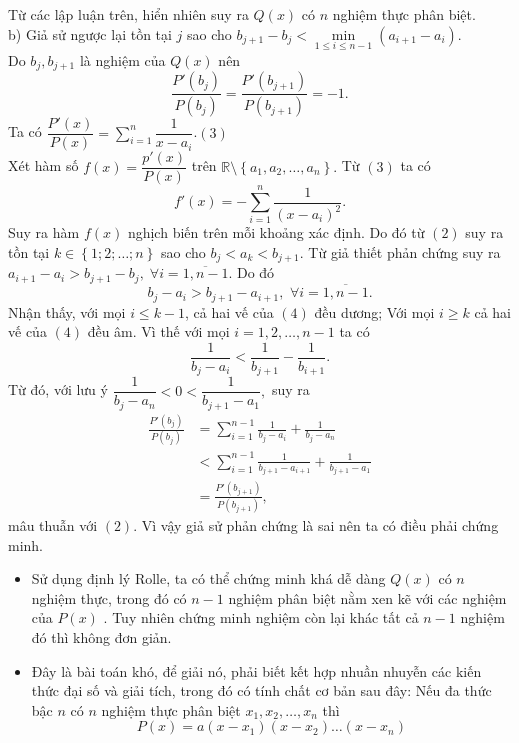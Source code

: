 \begin{bt}
{\begin{itemize}
		\end{itemize}
		Từ các lập luận trên, hiển nhiên suy ra $Q(x)$ có $n$ nghiệm thực phân biệt.\\
		b) Giả sử ngược lại tồn tại $j$ sao cho $b_{j+1}-b_{j}<\underset{1\leq i\leq n-1}{\min}\left ( a_{i+1} -a_{i}\right ). $\\
		Do $b_{j},b_{j+1}$ là nghiệm của $Q(x)$ nên 
		\[\frac{P'\left ( b_j \right )}{P\left ( b_j \right )}=\frac{P'\left ( b_{j+1} \right )}{P\left ( b_{j+1} \right )}=-1.\tag{2}\]
		Ta có $\dfrac{P'\left ( x \right )}{P\left ( x \right )}=\sum_{i=1}^{n}\dfrac{1}{x-a_{i}}$.\hfill$(3)$\\
		Xét hàm số $f\left ( x \right )=\dfrac{p'\left ( x \right )}{P\left ( x \right )} $ trên $\mathbb{R}\setminus \left \{ a_1,a_2,\dots,a_n \right \}. $ Từ $(3)$ ta có $$f'\left ( x \right )=-\sum_{i=1}^{n}\frac{1}{\left ( x-a_{i} \right )^{2}}. $$
		Suy ra hàm $f(x)$ nghịch biến trên mỗi khoảng xác định. 
		Do đó từ $(2)$ suy ra tồn tại $ k\in\left \{ 1;2;\dots;n \right \}$ sao cho $ b_j<a_k<b_{j+1}.$
		Từ giả thiết phản chứng suy ra  $a_{i+1}-a_i>b_{j+1}-b_{j}, \;\forall i=\overline{1,n-1}. $ Do đó 
		\[b_j-a_i>b_{j+1}-a_{i+1},\,\, \forall i=\overline{1,n-1}.\tag{4}\]
		Nhận thấy, với mọi $ i\leq k-1$, cả hai vế của $(4)$ đều dương; Với mọi $i\geq k $ cả hai vế của $(4)$ đều âm. Vì thế với mọi $i=1,2,\dots,n-1$ ta có 
		$$ \frac{1}{b_{j}-a_i}< \frac{1}{b_{j+1}}-\frac{1}{b_{i+1}}. $$
		Từ đó, với lưu ý  $\dfrac{1}{b_j-a_n}<0<\dfrac{1}{b_{j+1}-a_1}, $ suy ra 
		{\allowdisplaybreaks
		\begin{align*}
		\frac{P'\left ( b_j \right )}{P\left ( b_j \right )}&=\sum_{i=1}^{n-1}\frac{1}{b_j-a_i}+\frac{1}{b_j-a_n}\\
		&<\sum_{i=1}^{n-1}\frac{1}{b_{j+1}-a_{i+1}}+\frac{1}{b_{j+1}-a_1}\\
		&=\frac{P'\left ( b_{j+1} \right )}{P\left ( b_{j+1} \right )},
		\end{align*}}mâu thuẫn với $(2).$ Vì vậy giả sử phản chứng là sai nên ta có điều phải chứng minh.		
		\begin{nx}\hfill
		\begin{itemize}
			\item Sử dụng định lý Rolle, ta có thể chứng minh khá dễ dàng $Q(x)$ có $n$ nghiệm thực, trong đó có $n-1$ nghiệm phân biệt nằm xen kẽ với các nghiệm của $P(x)$ . Tuy nhiên chứng minh nghiệm còn lại khác tất cả $n-1$ nghiệm đó thì không đơn giản.
			\item  Đây là bài toán khó, để giải nó, phải biết kết hợp nhuần nhuyễn các kiến thức đại số và giải tích, trong đó có tính chất cơ bản sau đây: Nếu đa thức bậc $n$ có $n$ nghiệm thực phân biệt $x_1,x_2,\dots,x_n$ thì $$P\left ( x \right )=a\left ( x-x_{1} \right )\left ( x-x_{2} \right )\dots\left ( x-x_{n} \right ) $$

\end{itemize}
\end{nx}}
\end{bt}
